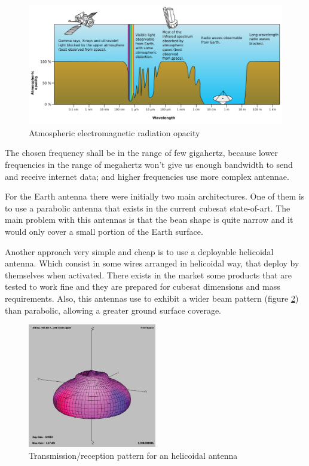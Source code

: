 \begin{figure}[h]
	\centering
	\includegraphics[width=\textwidth]{img/earth_freq.png}
	\caption{Atmospheric electromagnetic radiation opacity}
	\label{fig:frequency_atmosphere_opacity}
\end{figure}

The chosen frequency shall be in the range of few gigahertz, because lower
frequencies in the range of megahertz won't give us enough bandwidth to send and
receive internet data; and higher frequencies use more complex antennae.

For the Earth antenna there were initially two main architectures. One of them
is to use a parabolic antenna that exists in the current cubesat state-of-art.
The main problem with this antennas is that the bean shape is quite narrow and
it would only cover a small portion of the Earth surface.

Another approach very simple and cheap is to use a deployable helicoidal antenna.
Which consist in some wires arranged in helicoidal way, that deploy by themselves
when activated. There exists in the market some products that are tested to work
fine and they are prepared for cubesat dimensions and mass requirements.
Also, this antennas use to exhibit a wider beam pattern (figure \ref{fig:helicoidal_pattern})
than parabolic, allowing a greater ground surface coverage.

\begin{figure}[h]
	\centering
	\includegraphics[width=0.5\textwidth]{img/Earth_antenna_pattern.png}
	\caption[Helicoidal antenna radiation pattern]{Transmission/reception pattern for an helicoidal antenna}
	\label{fig:helicoidal_pattern}
\end{figure}

